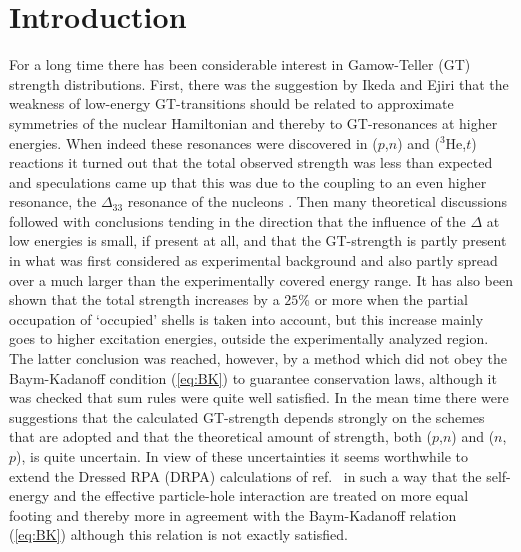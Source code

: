 \section{Introduction}
For a long time there has been considerable interest in Gamow-Teller (GT) 
strength distributions. First, there was the suggestion by Ikeda\cite{IFF63} 
and Ejiri\cite{EIF68} that the weakness of low-energy GT-transitions should 
be related to approximate symmetries of the nuclear Hamiltonian and thereby to 
GT-resonances at higher energies. When indeed these resonances were discovered 
in ($p$,$n$) and ($^{3}$He,$t$) reactions%
\cite{GLH80,GGG80,GRT81,HGB81,ACB85,CAB86}
it turned out that the total observed strength was less than expected and 
speculations came up that this was due to the coupling to an even higher 
resonance, the $\Delta_{33}$ resonance of the nucleons%
\cite{BM81,BCT81,OKS82}. Then many theoretical discussions followed%
\cite{DNS90,Ga90,Rij93,RGBA93}
with conclusions tending in the direction that the influence of the $\Delta$ 
at low energies is small, if present at all, and that the GT-strength is 
partly present in what was first considered as experimental background and 
also partly spread over a much larger than the experimentally covered energy 
range\cite{DNS90,Rij93}. It has also been shown that the total strength 
increases by a $25$\% or more when the partial occupation of `occupied' shells 
is taken into account\cite{ALV85,NDW88,Rij93}, but this increase mainly goes 
to higher excitation energies, outside the experimentally analyzed 
region\cite{Rij93}. The latter conclusion was reached, however, by a method 
which did not obey the Baym-Kadanoff condition (\ref{eq:BK}) to guarantee 
conservation laws, although it was checked that sum rules were quite well 
satisfied.
In the mean time there were suggestions\cite{MKT94} that the calculated 
GT-strength depends strongly on the schemes that are adopted and that the 
theoretical amount of strength, both ($p$,$n$) and ($n$,$p$), is quite 
uncertain. In view of these uncertainties it seems worthwhile to extend the 
Dressed RPA (DRPA) calculations of ref.~\cite{Rij93} in such a way that the 
self-energy and the effective particle-hole interaction are treated on more 
equal footing and thereby more in agreement with the Baym-Kadanoff 
relation (\ref{eq:BK}) although this relation is not exactly satisfied.


